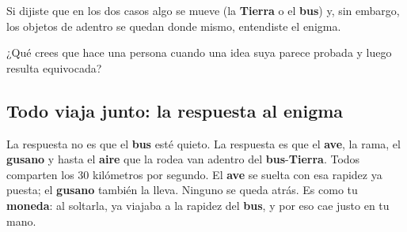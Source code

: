\documentclass[
  spanish,
  letterpaper,
  12pt,
  oneside,
  open=any,
  DIV=15]{scrbook}
\begin{document}
\begin{tcolorbox}[enhanced jigsaw, arc=.35mm, bottomrule=.15mm, bottomtitle=1mm, breakable, colback=white, colbacktitle=quarto-callout-tip-color!10!white, colframe=quarto-callout-tip-color-frame, coltitle=black, left=2mm, leftrule=.75mm, opacityback=0, opacitybacktitle=0.6, rightrule=.15mm, title=\textcolor{quarto-callout-tip-color}{\faLightbulb}\hspace{0.5em}{Apoyo Procedimental (Comprobación)}, titlerule=0mm, toprule=.15mm, toptitle=1mm]

Si dijiste que en los dos casos algo se mueve (la \textbf{Tierra} o el
\textbf{bus}) y, sin embargo, los objetos de adentro se quedan donde
mismo, entendiste el enigma.

\end{tcolorbox}

\begin{tcolorbox}[enhanced jigsaw, arc=.35mm, bottomrule=.15mm, bottomtitle=1mm, breakable, colback=white, colbacktitle=quarto-callout-note-color!10!white, colframe=quarto-callout-note-color-frame, coltitle=black, left=2mm, leftrule=.75mm, opacityback=0, opacitybacktitle=0.6, rightrule=.15mm, title=\textcolor{quarto-callout-note-color}{\faInfo}\hspace{0.5em}{Pregunta socioemocional}, titlerule=0mm, toprule=.15mm, toptitle=1mm]

¿Qué crees que hace una persona cuando una idea suya parece probada y
luego resulta equivocada?

\end{tcolorbox}

\subsection{Todo viaja junto: la respuesta al
enigma}\label{todo-viaja-junto-la-respuesta-al-enigma}

La respuesta no es que el \textcolor[HTML]{7C3AED}{\textbf{bus}} esté
quieto. La respuesta es que el \textcolor[HTML]{2563EB}{\textbf{ave}},
la rama, el \textcolor[HTML]{2563EB}{\textbf{gusano}} y hasta el
\textcolor[HTML]{2563EB}{\textbf{aire}} que la rodea van adentro del
\textbf{bus}-\textbf{Tierra}. Todos comparten los \(30\) kilómetros por
segundo. El \textbf{ave} se suelta con esa rapidez ya puesta; el
\textbf{gusano} también la lleva. Ninguno se queda atrás. Es como tu
\textcolor[HTML]{2563EB}{\textbf{moneda}}: al soltarla, ya viajaba a la
rapidez del \textbf{bus}, y por eso cae justo en tu mano.
\end{document}
